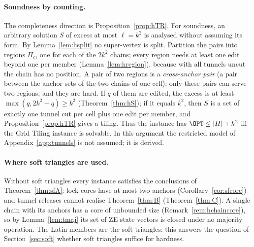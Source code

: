 \paragraph{Soundness by counting.} The completeness direction is Proposition~\ref{prop:hTR}. For soundness, an arbitrary solution $S$ of excess at most $\ell=k^2$ is analysed without assuming its form. By Lemma~\ref{lem:hsplit} no super-vertex is split. Partition the pairs into regions $\Pi_c$, one for each of the $2k^2$ chains; every region needs at least one edit beyond one per member (Lemma~\ref{lem:hregion}), because with all tunnels uncut the chain has no position. A pair of two regions is a \emph{cross-anchor pair} (a pair between the anchor sets of the two chains of one cell); only these pairs can serve two regions, and they are hard. If $q$ of them are edited, the excess is at least $\max(q,2k^2-q)\ge k^2$ (Theorem~\ref{thm:hS}); if it equals $k^2$, then $S$ is a set of exactly one tunnel cut per cell plus one edit per member, and Proposition~\ref{prop:hTR} gives a tiling. Thus the instance has $\OPT\le|H|+k^2$ iff the Grid Tiling instance is solvable. In this argument the restricted model of Appendix~\ref{app:tunnels} is not assumed; it is derived.

\paragraph{Where soft triangles are used.} Without soft triangles every instance satisfies the conclusions of Theorem~\ref{thm:sfA}: lock cores have at most two anchors (Corollary~\ref{cor:sfcore}) and tunnel releases cannot realise Theorem~\ref{thm:B} (Theorem~\ref{thm:C}). A single chain with its anchors has a core of unbounded size (Remark~\ref{rem:hchaincore}), so by Lemma~\ref{lem:tmaj} its set of ZE state vectors is closed under no majority operation. The Latin members are the soft triangles: this answers the question of Section~\ref{sec:soft} whether soft triangles suffice for hardness.

